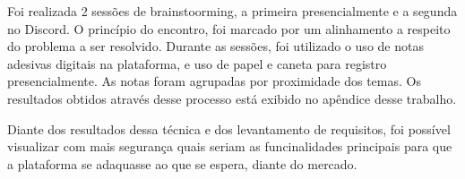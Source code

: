 Foi realizada 2 sessões de brainstoorming, a primeira presencialmente e a segunda no Discord. O princípio do encontro, foi marcado por um alinhamento a respeito do problema a ser resolvido. Durante as sessões, foi utilizado o uso de notas adesivas digitais na plataforma, e uso de papel e caneta para registro presencialmente. As notas foram agrupadas por proximidade dos temas. Os resultados obtidos através desse processo está exibido no apêndice desse trabalho. 

Diante dos resultados dessa técnica e dos levantamento de requisitos, foi possível visualizar com mais segurança quais seriam as funcinalidades principais para que a plataforma se adaquasse ao que se espera, diante do mercado.
